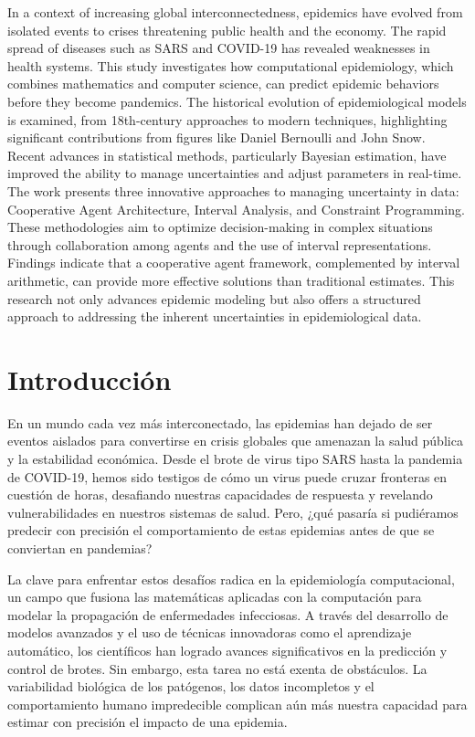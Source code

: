 \documentclass{article}
\begin{document}
In a context of increasing global interconnectedness, epidemics have evolved from isolated events to crises threatening public health and the economy. The rapid spread of diseases such as SARS and COVID-19 has revealed weaknesses in health systems. This study investigates how computational epidemiology, which combines mathematics and computer science, can predict epidemic behaviors before they become pandemics.
The historical evolution of epidemiological models is examined, from 18th-century approaches to modern techniques, highlighting significant contributions from figures like Daniel Bernoulli and John Snow. Recent advances in statistical methods, particularly Bayesian estimation, have improved the ability to manage uncertainties and adjust parameters in real-time.
The work presents three innovative approaches to managing uncertainty in data: Cooperative Agent Architecture, Interval Analysis, and Constraint Programming. These methodologies aim to optimize decision-making in complex situations through collaboration among agents and the use of interval representations. Findings indicate that a cooperative agent framework, complemented by interval arithmetic, can provide more effective solutions than traditional estimates. This research not only advances epidemic modeling but also offers a structured approach to addressing the inherent uncertainties in epidemiological data.

\newpage

\section*{Introducción}
\label{sec:12}

En un mundo cada vez más interconectado, las epidemias han dejado de ser eventos aislados para convertirse en crisis globales que amenazan la salud pública y la estabilidad económica. Desde el brote de virus tipo SARS hasta la pandemia de COVID-19, hemos sido testigos de cómo un virus puede cruzar fronteras en cuestión de horas, desafiando nuestras capacidades de respuesta y revelando vulnerabilidades en nuestros sistemas de salud. Pero, ¿qué pasaría si pudiéramos predecir con precisión el comportamiento de estas epidemias antes de que se conviertan en pandemias?

La clave para enfrentar estos desafíos radica en la epidemiología computacional, un campo que fusiona las matemáticas aplicadas con la computación para modelar la propagación de enfermedades infecciosas. A través del desarrollo de modelos avanzados y el uso de técnicas innovadoras como el aprendizaje automático, los científicos han logrado avances significativos en la predicción y control de brotes. Sin embargo, esta tarea no está exenta de obstáculos. La variabilidad biológica de los patógenos, los datos incompletos y el comportamiento humano impredecible complican aún más nuestra capacidad para estimar con precisión el impacto de una epidemia.
\end{document}
